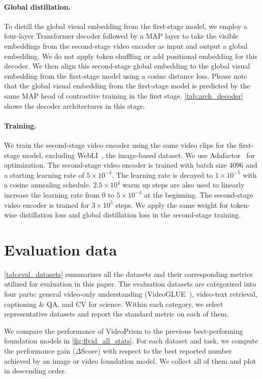 \documentclass{article}
\theoremstyle{plain}
\theoremstyle{definition}
\theoremstyle{remark}
\newcommand{\OURS}{VideoPrism\xspace}
\begin{document}
\paragraph{Global distillation.} To distill the global visual embedding from the first-stage model, we employ a four-layer Transformer decoder followed by a MAP layer to take the visible embeddings from the second-stage video encoder as input and output a global embedding.
We do not apply token shuffling or add positional embedding for this decoder.
We then align this second-stage global embedding to the global visual embedding from the first-stage model using a cosine distance loss.
Please note that the global visual embedding from the first-stage model is predicted by the same MAP head of contrastive training in the first stage.
\cref{tab:arch_decoder} shows the decoder architectures in this stage.


\paragraph{Training.} We train the second-stage video encoder using the same video clips for the first-stage  model, excluding WebLI~\cite{chen2023pali}, the image-based dataset.
We use Adafactor~\cite{shazeer2018adafactor} for optimization.
The second-stage video encoder is trained with batch size $4096$ and a starting learning rate of $5 \times 10^{-4}$.
The learning rate is decayed to $1 \times 10^{-5}$ with a cosine annealing schedule.
$2.5 \times 10^4$ warm up steps are also used to linearly increase the learning rate from $0$ to $5 \times 10^{-4}$ at the beginning.
The second-stage video encoder is trained for $3 \times 10^5$ steps.
We apply the same weight for token-wise distillation loss and global distillation loss in the second-stage training. \section{Evaluation data}
\label{app:evaluation_data}

\cref{tab:eval_datasets} summarizes all the datasets and their corresponding metrics utilized for evaluation in this paper.
The evaluation datasets are categorized into four parts: general video-only understanding (VideoGLUE~\cite{yuan2023videoglue}), video-text retrieval, captioning \& QA, and CV for science.
Within each category, we select representative datasets and report the standard metric on each of them.

We compare the performance of \OURS to the previous best-performing foundation models in \cref{fig:flvid_all_stats}.
For each dataset and task, we compute the performance gain ($\Delta$Score) with respect to the best reported number achieved by an image or video foundation model.
We collect all of them and plot in descending order.
\end{document}
